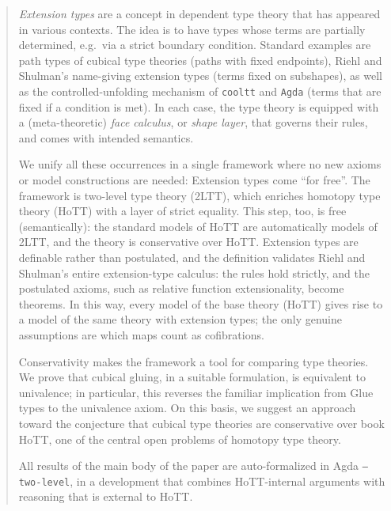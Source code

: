 \begin{abstract}
\emph{Extension types} are a concept in dependent type theory that has appeared in various contexts.
The idea is to have types whose terms are partially determined, e.g.\ via a strict boundary condition.
Standard examples are path types of cubical type theories (paths with fixed endpoints), Riehl and Shulman's name-giving extension types (terms fixed on subshapes), as well as the controlled-unfolding mechanism of \texttt{cooltt} and \texttt{Agda} (terms that are fixed if a condition is met).
In each case, the type theory is equipped with a (meta-theoretic) \emph{face calculus}, or \emph{shape layer}, that governs their rules, and comes with intended semantics.

We unify all these occurrences in a single framework where no new axioms or model constructions are needed: Extension types come ``for free''.
The framework is two-level type
theory (2LTT), which enriches homotopy type theory (HoTT) with a layer of
strict equality. This step, too, is free (semantically): the standard models of
HoTT are automatically models of 2LTT, and the theory is conservative over HoTT.
Extension types are definable
rather than postulated, and the definition validates Riehl and Shulman's
entire extension-type calculus: the rules hold strictly, and the postulated axioms,
such as relative function extensionality, become theorems.
In this way, every model of the base theory (HoTT) gives rise to a model
of the same theory with extension types; the only genuine assumptions are
which maps count as cofibrations.

Conservativity makes the framework a tool for comparing type theories. We
prove that cubical gluing, in a suitable formulation, is equivalent to
univalence; in particular, this reverses the familiar implication from Glue
types to the univalence axiom. On this basis, we suggest an approach toward
the conjecture that cubical type
theories are conservative over book HoTT, one of the
central open problems of homotopy type theory.

All results of the main body of the paper are
auto-formalized in Agda \texttt{--two-level}, in a development that combines HoTT-internal arguments with reasoning that is external to HoTT.

\end{abstract}

\maketitle

